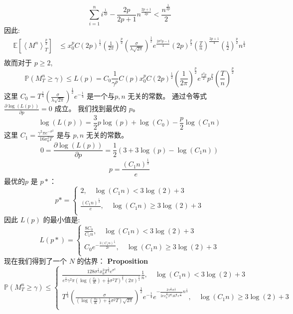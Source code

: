  \[
 \sum_{i=1}^{n}i^{\frac{1}{2p}}-\frac{2p}{2p+1}n^{\frac{2p+1}{2p}}<\frac{n^{\frac{1}{2p}}}{2}
 \]
 因此:
 \[
 \begin{split}
 \mathbb{E}[\left \langle M^n \right \rangle_T^{\frac{p}{2}}]
 &\leq x_0^pC(2p)^{\frac{1}{2}}(\frac{1}{2\pi})^{\frac{p}{2}}(\frac{\sigma}{\lambda\sqrt{2\pi}})^{\frac{1}{2}}e^{\frac{2\sigma^2p-1}{4}}
 (2p)^{\frac{p}{2}}(\frac{T}{n})^{\frac{2p+1}{4}}(\frac{1}{2})^{\frac{p}{2}}n^{\frac{1}{4}}\\
 \end{split}
 \]
 故而对于 $p\geq 2$,
 \[
 \mathbb{P}(M_T^n\geq \gamma)\leq L(p)=C_0\frac{1}{\gamma^p}C(p)x_0^pC(2p)^{\frac{1}{2}}(\frac{1}{2\pi})^{\frac{p}{2}}e^{\frac{\sigma^2p}{2}}
 p^{\frac{p}{2}}(\frac{T}{n})^{\frac{p}{2}}
 \]
 这里
 $C_0=T^{\frac{1}{4}}(\frac{\sigma}{\lambda\sqrt{2\pi}})^{\frac{1}{2}}e^{-\frac{1}{4}}$ 是一个与$p, n$ 无关的常数。  
 通过令等式 $\frac{\partial \log(L(p))}{\partial p}=0$ 成立。 我们找到最优的 $p$。
 \[
 \log(L(p))=\frac{3}{2}p\log(p)+\log(C_0)-\frac{p}{2}\log(C_1n)
 \]
 这里 $C_1=\frac{\gamma^2\pi e^{-\sigma^2}}{16x_0^2T}$ 是与 $p, n$ 无关的常数。
 \[
 0=\frac{\partial\log(L(p))}{\partial p}=\frac{1}{2}(3+3\log(p)-\log(C_1n)) 
 \]
 \[
 p=\frac{(C_1n)^{\frac{1}{3}}}{e}
 \]
 最优的$p$ 是 $p*$：
 \[
 p*=
 \begin{cases}
 2, \quad  \log(C_1n)<3\log(2)+3\\
 \frac{(C_1n)^{\frac{1}{3}}}{e}, \quad \log(C_1n)\geq 3\log(2)+3\\
 \end{cases}
 \]
 因此 $L(p)$ 的最小值是:
 \[
 L(p*)=
 \begin{cases}
 \frac{8C_0}{C_1n}, \quad \log(C_1n)<3\log(2)+3\\
 C_0e^{-\frac{3(C_1n)^{\frac{1}{3}}}{2e}}, \quad \log(C_1n)\geq 3\log(2)+3\\
 \end{cases}
 \]
 现在我们得到了一个 $N$ 的估界：
 \textbf{Proposition}
 \[
 \mathbb{P}(M_T^n\geq \gamma)\leq 
 \begin{cases}
 \frac{128\sigma^{\frac{1}{2}}x_0^2T^{\frac{5}{4}}e^{\sigma^2}}{e^{\frac{1}{4}}\gamma^2\pi (\log(\frac{x_0}{K})+\frac{1}{2}\sigma^2T)^{\frac{1}{2}}(2\pi)^{\frac{1}{4}}}\frac{1}{n}, \quad \log(C_1n)<3\log(2)+3\\
 T^{\frac{1}{4}}(\frac{\sigma}{(\log(\frac{x_0}{K})+\frac{1}{2}\sigma^2T)\sqrt{2\pi}})^{\frac{1}{2}}e^{-\frac{1}{4}}e^{-\frac{3\gamma^{\frac{2}{3}}\pi^{\frac{1}{3}}}{2ex_0^{\frac{2}{3}}T^{\frac{1}{3}}16^{\frac{1}{3}}e^{\frac{\sigma^2}{3}}}n^{\frac{1}{3}}}, \quad \log(C_1n)\geq 3\log(2)+3\\
 \end{cases}
 \]



